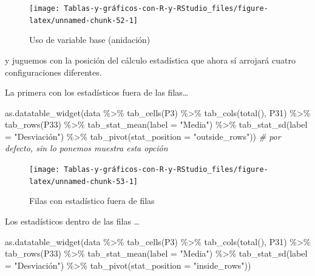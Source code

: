 \documentclass[
]{book}
\newenvironment{Shaded}{\begin{snugshade}}{\end{snugshade}}
\newcommand{\AttributeTok}[1]{\textcolor[rgb]{0.77,0.63,0.00}{#1}}
\newcommand{\CommentTok}[1]{\textcolor[rgb]{0.56,0.35,0.01}{\textit{#1}}}
\newcommand{\FunctionTok}[1]{\textcolor[rgb]{0.00,0.00,0.00}{#1}}
\newcommand{\NormalTok}[1]{#1}
\newcommand{\SpecialCharTok}[1]{\textcolor[rgb]{0.00,0.00,0.00}{#1}}
\newcommand{\StringTok}[1]{\textcolor[rgb]{0.31,0.60,0.02}{#1}}
\begin{document}
\begin{figure}[H]

{\centering \texttt{[image: Tablas-y-gráficos-con-R-y-RStudio\_files/figure-latex/unnamed-chunk-52-1]} 

}

\caption{Uso de variable base (anidación)}\label{fig:unnamed-chunk-52}
\end{figure}

y juguemos con la posición del cálculo estadística que ahora sí arrojará cuatro configuraciones diferentes.

La primera con los estadísticos fuera de las filas\ldots{}

\begin{Shaded}
\begin{Highlighting}[]
\FunctionTok{as.datatable\_widget}\NormalTok{(data }\SpecialCharTok{\%\textgreater{}\%} \FunctionTok{tab\_cells}\NormalTok{(P3) }\SpecialCharTok{\%\textgreater{}\%} \FunctionTok{tab\_cols}\NormalTok{(}\FunctionTok{total}\NormalTok{(), }
\NormalTok{  P31) }\SpecialCharTok{\%\textgreater{}\%} \FunctionTok{tab\_rows}\NormalTok{(P33) }\SpecialCharTok{\%\textgreater{}\%} \FunctionTok{tab\_stat\_mean}\NormalTok{(}\AttributeTok{label =} \StringTok{"Media"}\NormalTok{) }\SpecialCharTok{\%\textgreater{}\%} 
  \FunctionTok{tab\_stat\_sd}\NormalTok{(}\AttributeTok{label =} \StringTok{"Desviación"}\NormalTok{) }\SpecialCharTok{\%\textgreater{}\%} \FunctionTok{tab\_pivot}\NormalTok{(}\AttributeTok{stat\_position =} \StringTok{"outside\_rows"}\NormalTok{))  }\CommentTok{\# por defecto, sin lo ponemos muestra esta opción}
\end{Highlighting}
\end{Shaded}

\begin{figure}[H]

{\centering \texttt{[image: Tablas-y-gráficos-con-R-y-RStudio\_files/figure-latex/unnamed-chunk-53-1]} 

}

\caption{Filas con estadístico fuera de filas}\label{fig:unnamed-chunk-53}
\end{figure}

Los estadísticos dentro de las filas \ldots{}

\begin{Shaded}
\begin{Highlighting}[]
\FunctionTok{as.datatable\_widget}\NormalTok{(data }\SpecialCharTok{\%\textgreater{}\%} \FunctionTok{tab\_cells}\NormalTok{(P3) }\SpecialCharTok{\%\textgreater{}\%} \FunctionTok{tab\_cols}\NormalTok{(}\FunctionTok{total}\NormalTok{(), }
\NormalTok{  P31) }\SpecialCharTok{\%\textgreater{}\%} \FunctionTok{tab\_rows}\NormalTok{(P33) }\SpecialCharTok{\%\textgreater{}\%} \FunctionTok{tab\_stat\_mean}\NormalTok{(}\AttributeTok{label =} \StringTok{"Media"}\NormalTok{) }\SpecialCharTok{\%\textgreater{}\%} 
  \FunctionTok{tab\_stat\_sd}\NormalTok{(}\AttributeTok{label =} \StringTok{"Desviación"}\NormalTok{) }\SpecialCharTok{\%\textgreater{}\%} \FunctionTok{tab\_pivot}\NormalTok{(}\AttributeTok{stat\_position =} \StringTok{"inside\_rows"}\NormalTok{))}
\end{Highlighting}
\end{Shaded}
\end{document}
